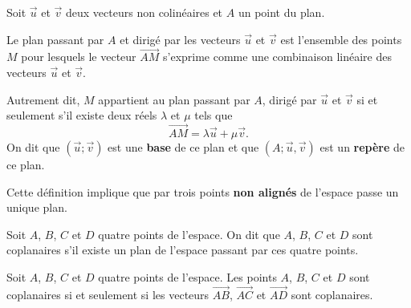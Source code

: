 \documentclass[11pt,fleqn, openany]{book} %
\begin{document}
\begin{definition} Soit $\vec u$ et $\vec v$ deux vecteurs non colinéaires et $A$ un point du plan.

Le plan passant par $A$ et dirigé par les vecteurs $\vec u$ et $\vec v$ est l'ensemble des points $M$ pour lesquels le vecteur $\overrightarrow{AM}$ s'exprime comme une combinaison linéaire des vecteurs $\vec u$ et $\vec v$.

Autrement dit, $M$ appartient au plan passant par $A$, dirigé par $\vec u$ et $\vec v$ si et seulement s'il existe deux réels $\lambda$ et $\mu$ tels que 
\[ \overrightarrow{AM}= \lambda \vec u + \mu \vec v .\]
On dit que $(\vec u ; \vec v)$ est une \textbf{base} de ce plan et que $(A ; \vec u, \vec v)$ est un \textbf{repère} de ce plan.\end{definition}

Cette définition implique que par trois points \textbf{non alignés} de l'espace passe un unique plan. 


\newpage
\begin{definition}Soit $A$, $B$, $C$ et $D$ quatre points de l'espace. On dit que $A$, $B$, $C$ et $D$ sont coplanaires s'il existe un plan de l'espace passant par ces quatre points.\end{definition}

\begin{proposition}Soit $A$, $B$, $C$ et $D$ quatre points de l'espace. Les points $A$, $B$, $C$ et $D$ sont coplanaires si et seulement si les vecteurs $\overrightarrow{AB}$, $\overrightarrow{AC}$ et $\overrightarrow{AD}$ sont coplanaires.\end{proposition}
\end{document}
